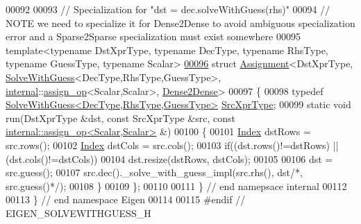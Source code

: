 \begin{DoxyCode}
00092 
00093 \textcolor{comment}{// Specialization for "dst = dec.solveWithGuess(rhs)"}
00094 \textcolor{comment}{// NOTE we need to specialize it for Dense2Dense to avoid ambiguous specialization error and a
       Sparse2Sparse specialization must exist somewhere}
00095 \textcolor{keyword}{template}<\textcolor{keyword}{typename} DstXprType, \textcolor{keyword}{typename} DecType, \textcolor{keyword}{typename} RhsType, \textcolor{keyword}{typename} GuessType, \textcolor{keyword}{typename} Scalar>
\hyperlink{struct_eigen_1_1internal_1_1_assignment_3_01_dst_xpr_type_00_01_solve_with_guess_3_01_dec_type_092a64ffd1d5684a219c114a5d8922118}{00096} \textcolor{keyword}{struct }\hyperlink{struct_eigen_1_1internal_1_1_assignment}{Assignment}<DstXprType, \hyperlink{group___iterative_linear_solvers___module_class_eigen_1_1_solve_with_guess}{SolveWithGuess}<DecType,RhsType,GuessType>, 
      \hyperlink{namespaceinternal}{internal}::\hyperlink{struct_eigen_1_1internal_1_1assign__op}{assign\_op}<Scalar,Scalar>, \hyperlink{struct_eigen_1_1internal_1_1_dense2_dense}{Dense2Dense}>
00097 \{
00098   \textcolor{keyword}{typedef} \hyperlink{group___iterative_linear_solvers___module_class_eigen_1_1_solve_with_guess}{SolveWithGuess<DecType,RhsType,GuessType>} 
      \hyperlink{group___iterative_linear_solvers___module_class_eigen_1_1_solve_with_guess}{SrcXprType};
00099   \textcolor{keyword}{static} \textcolor{keywordtype}{void} run(DstXprType &dst, \textcolor{keyword}{const} SrcXprType &src, \textcolor{keyword}{const} 
      \hyperlink{struct_eigen_1_1internal_1_1assign__op}{internal::assign\_op<Scalar,Scalar>} &)
00100   \{
00101     \hyperlink{namespace_eigen_a62e77e0933482dafde8fe197d9a2cfde}{Index} dstRows = src.rows();
00102     \hyperlink{namespace_eigen_a62e77e0933482dafde8fe197d9a2cfde}{Index} dstCols = src.cols();
00103     \textcolor{keywordflow}{if}((dst.rows()!=dstRows) || (dst.cols()!=dstCols))
00104       dst.resize(dstRows, dstCols);
00105 
00106     dst = src.guess();
00107     src.dec().\_solve\_with\_guess\_impl(src.rhs(), dst\textcolor{comment}{/*, src.guess()*/});
00108   \}
00109 \};
00110 
00111 \} \textcolor{comment}{// end namepsace internal}
00112 
00113 \} \textcolor{comment}{// end namespace Eigen}
00114 
00115 \textcolor{preprocessor}{#endif // EIGEN\_SOLVEWITHGUESS\_H}
\end{DoxyCode}
